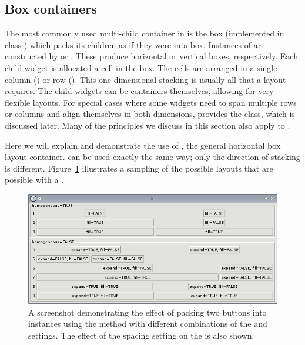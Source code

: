 \subsection{Box containers}
\label{sec:RGtk2:layout:box}

The most commonly used multi-child container in \GTK\/ is the box
(implemented in class ) which packs its children as if
they were in a box. Instances of  are constructed by
 or .  These produce horizontal or
vertical boxes, respectively. Each child widget is allocated a cell in
the box.  The cells are arranged in a single column ()
or row (). This one dimensional stacking is usually all
that a layout requires. The child widgets can be containers
themselves, allowing for very flexible layouts. For special cases
where some widgets need to span multiple rows or columns and align
themselves in both dimensions, \GTK\/ provides the 
class, which is discussed later.  Many of the principles we discuss in
this section also apply to .

Here we will explain and demonstrate the use of , the
general horizontal box layout container.  can be used
exactly the same way; only the direction of stacking is different.
Figure~\ref{fig:packing} illustrates a sampling of the possible
layouts that are possible with a .

\begin{figure}[h!tbp]
  \begin{center}
    \includegraphics[angle=90, width=.65\textwidth]{packing.png}
    \caption{\label{fig:packing}A screenshot demonstrating the effect
      of packing two buttons into  instances using the
       method with different combinations of
      the  and
       settings.  The effect of the
       spacing setting on the
       is also shown.}
  \end{center}
\end{figure}

